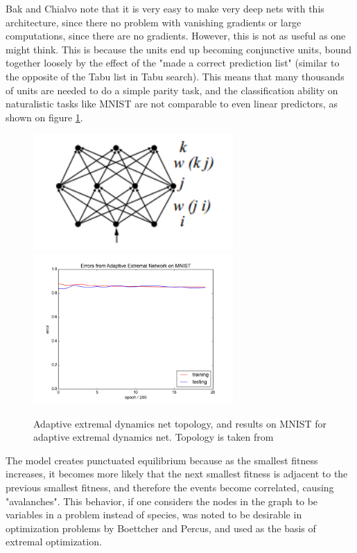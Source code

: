\documentclass[12pt]{article}
\begin{document}
Bak and Chialvo note that it is very easy to make very deep nets with this architecture, since there no problem with vanishing gradients or large computations, since there are no gradients. However, this is not as useful as one might think. This is because the units end up becoming conjunctive units, bound together loosely by the effect of the "made a correct prediction list" (similar to the opposite of the Tabu list in Tabu search\cite{tabu}). This means that many thousands of units are needed to do a simple parity task, and the classification ability on naturalistic tasks like MNIST are not comparable to even linear predictors, as shown on figure \ref{fig:baknet_res}.

\begin{figure}
  \includegraphics[width=3in]{bak_chialvo_net_topology}
  \includegraphics[width=3in]{bak_plot}
  \label{fig:baknet_res}
  \caption{Adaptive extremal dynamics net topology, and results on MNIST for adaptive extremal dynamics net. Topology is taken from \cite{bakchialvo}}
\end{figure}

The model creates punctuated equilibrium because as the smallest fitness increases, it becomes more likely that the next smallest fitness is adjacent to the previous smallest fitness, and therefore the events become correlated, causing "avalanches". This behavior, if one considers the nodes in the graph to be variables in a problem instead of species, was noted to be desirable in optimization problems by Boettcher and Percus\cite{boettcher}, and used as the basis of extremal optimization.
\end{document}
